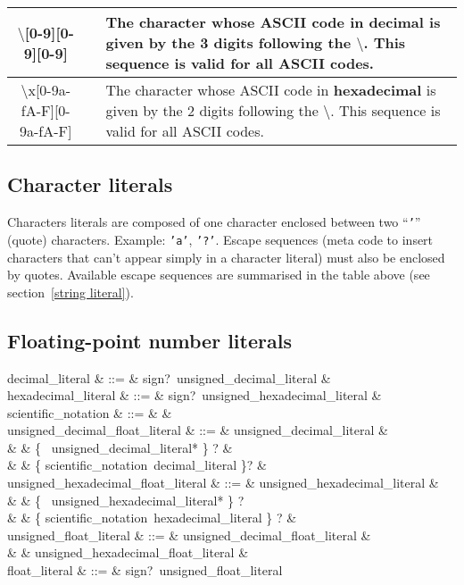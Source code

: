 \begin{tabular}{|c|c|p{7cm}|}
  \hline
  $\setminus$[0-9][0-9][0-9] & & The character whose ASCII code in
                                {\bf decimal} is given by the 3 digits
                                following the $\setminus$. This
                                sequence is valid for all
                                ASCII codes. \\
  \hline
  $\setminus$x[0-9a-fA-F][0-9a-fA-F] & & The character whose ASCII code in
                                {\bf hexadecimal} is given by the 2
                                digits following the $\setminus$. This
                                sequence is valid for all
                                ASCII codes.\\
  \hline
\end{tabular}

\subsection{Character literals}
\label{character literals}
\label{hexadecimal}
Characters literals are composed of one character enclosed between two
``{\tt '}'' (quote) characters. Example: {\tt 'a'}, {\tt '?'}.
Escape sequences (meta code to insert characters that can't appear
simply in a character literal) must also be enclosed by
quotes. Available escape sequences are summarised in the table above
(see section~\ref{string literal}).

\subsection{Floating-point number literals}
\begin{syntax}
decimal\_literal & ::= & sign?\ unsigned\_decimal\_literal & \\
hexadecimal\_literal & ::= & sign?\ unsigned\_hexadecimal\_literal & \\
scientific\_notation & ::= &  \mid {} & \\
unsigned\_decimal\_float\_literal & ::= & unsigned\_decimal\_literal & \\
& &  \{ \ unsigned\_decimal\_literal* \} ? & \\
& &  \{ scientific\_notation\ decimal\_literal \}? & \\
unsigned\_hexadecimal\_float\_literal & ::= & unsigned\_hexadecimal\_literal &\\
& & \{ \ unsigned\_hexadecimal\_literal* \} ? \\
& & \{ scientific\_notation\ hexadecimal\_literal \} ? & \\
unsigned\_float\_literal & ::= & unsigned\_decimal\_float\_literal & \\
& & \mid unsigned\_hexadecimal\_float\_literal & \\
float\_literal & ::= & sign?\ unsigned\_float\_literal
\end{syntax}

